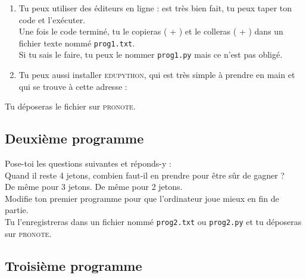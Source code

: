\documentclass[a4paper,12pt]{book}
\begin{document}
\begin{enumerate}[\bfseries 1.]
	\item 	 Tu peux utiliser des éditeurs en ligne :  est très bien fait, tu peux taper ton code et l'exécuter.\\
    Une fois le code terminé, tu le copieras (  +  ) et le colleras (  +  ) dans un fichier texte nommé \texttt{prog1.txt}.\\
    Si tu sais le faire, tu peux le nommer \texttt{prog1.py} mais ce n'est pas obligé.\\
    
	\item  Tu peux aussi installer \textsc{edupython}, qui est très simple à prendre en main et qui se trouve à cette adresse :
\end{enumerate}

Tu déposeras le fichier sur \textsc{pronote}.

\subsection*{Deuxième programme}

Pose-toi les questions suivantes et réponds-y :\\

Quand il reste 4 jetons, combien faut-il en prendre pour être sûr de gagner ?\\
De même  pour 3 jetons. De même pour 2 jetons.\\

Modifie ton premier programme pour que l'ordinateur joue mieux en fin de partie.\\

Tu l'enregistreras dans un fichier nommé \texttt{prog2.txt} ou \texttt{prog2.py} et tu déposeras sur \textsc{pronote}.

\subsection*{Troisième programme}
\end{document}

